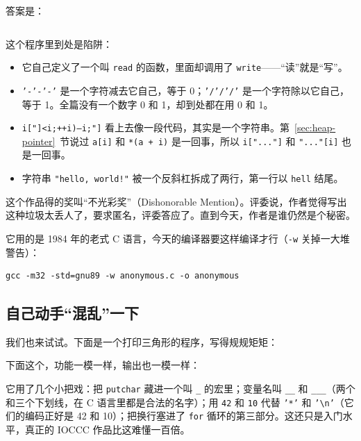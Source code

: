
答案是：
\inputminted[linenos=false]{text}{code/appc/out/anonymous.txt}

这个程序里到处是陷阱：
\begin{itemize}
  \item 它自己定义了一个叫 \texttt{read} 的函数，里面却调用了 \texttt{write}——“读”就是“写”。
  \item \texttt{'-'-'-'} 是一个字符减去它自己，等于 0；\texttt{'/'/'/'} 是一个字符除以它自己，等于 1。全篇没有一个数字 0 和 1，却到处都在用 0 和 1。
  \item \texttt{i["]<i;++i){--i;}"]} 看上去像一段代码，其实是一个字符串。第~\ref{sec:heap-pointer}~节说过 \texttt{a[i]} 和 \texttt{*(a + i)} 是一回事，所以 \texttt{i["..."]} 和 \texttt{"..."[i]} 也是一回事。
  \item 字符串 \texttt{"hello, world!"} 被一个反斜杠拆成了两行，第一行以 \texttt{hell} 结尾。
\end{itemize}

这个作品得的奖叫“不光彩奖”（Dishonorable Mention）。评委说，作者觉得写出这种垃圾太丢人了，要求匿名，评委答应了。直到今天，作者是谁仍然是个秘密。

它用的是 1984 年的老式 C 语言，今天的编译器要这样编译才行（\texttt{-w} 关掉一大堆警告）：
\begin{verbatim}
gcc -m32 -std=gnu89 -w anonymous.c -o anonymous
\end{verbatim}

\subsection{自己动手“混乱”一下}

我们也来试试。下面是一个打印三角形的程序，写得规规矩矩：


下面这个，功能一模一样，输出也一模一样：


它用了几个小把戏：把 \texttt{putchar} 藏进一个叫 \texttt{\_} 的宏里；变量名叫 \texttt{\_\_} 和 \texttt{\_\_\_}（两个和三个下划线，在 C 语言里都是合法的名字）；用 \texttt{42} 和 \texttt{10} 代替 \texttt{'*'} 和 \texttt{'\textbackslash n'}（它们的编码正好是 42 和 10）；把换行塞进了 \texttt{for} 循环的第三部分。这还只是入门水平，真正的 IOCCC 作品比这难懂一百倍。

